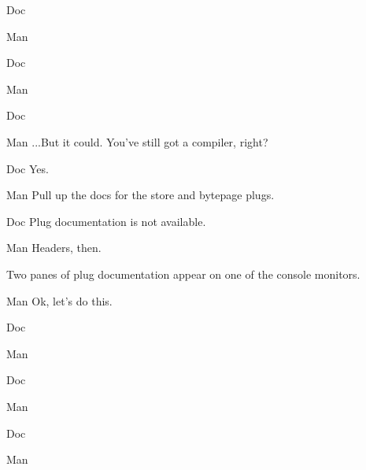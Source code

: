 \documentclass{screenplay}
\begin{document}
\begin{dialogue}{Doc}
\end{dialogue}
\begin{dialogue}{Man}
\end{dialogue}
\begin{dialogue}{Doc}
\end{dialogue}
\begin{dialogue}{Man}
\end{dialogue}
\begin{dialogue}{Doc}
\end{dialogue}
\begin{dialogue}{Man}
...But it could.  You've still got a compiler, right?
\end{dialogue}
\begin{dialogue}{Doc}
Yes.
\end{dialogue}
\begin{dialogue}{Man}
Pull up the docs for the store and bytepage plugs.
\end{dialogue}
\begin{dialogue}{Doc}
Plug documentation is not available.
\end{dialogue}
\begin{dialogue}{Man}
Headers, then.
\end{dialogue}
Two panes of plug documentation appear on one of the console monitors.
\begin{dialogue}{Man}
Ok, let's do this.
\end{dialogue}
\begin{dialogue}{Doc}
\end{dialogue}
\begin{dialogue}{Man}
\end{dialogue}
\begin{dialogue}{Doc}
\end{dialogue}
\begin{dialogue}{Man}
\end{dialogue}
\begin{dialogue}{Doc}
\end{dialogue}
\begin{dialogue}{Man}
\end{dialogue}

\theend
\end{document}

